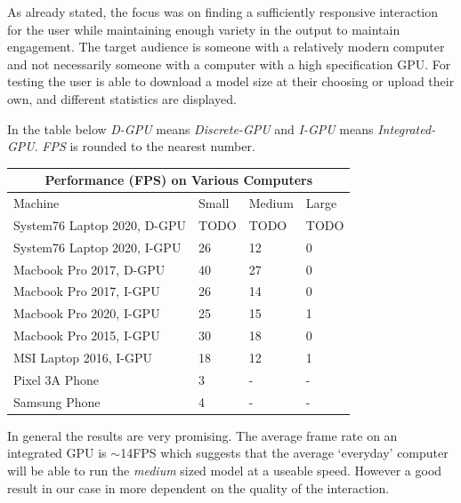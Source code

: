 \documentclass{article}
\begin{document}
As already stated, the focus was on finding a sufficiently responsive interaction for the user while maintaining enough variety in the output to maintain engagement. The target audience is someone with a relatively modern computer and not necessarily someone with a computer with a high specification GPU. For testing the user is able to download a model size at their choosing or upload their own, and different statistics are displayed.

In the table below \textit{D-GPU} means \textit{Discrete-GPU} and \textit{I-GPU} means \textit{Integrated-GPU}. \textit{FPS} is rounded to the nearest number.

\begin{small}
	\begin{center}
		\begin{tabular}{p{5cm} p{1.5cm} p{1.5cm} p{1.5cm}}
			\toprule
			\multicolumn{4}{c}{Performance (FPS) on Various Computers} \\
			\toprule
			Machine                     & Small & Medium & Large       \\
			\midrule
			System76 Laptop 2020, D-GPU & TODO  & TODO   & TODO        \\
			System76 Laptop 2020, I-GPU & 26    & 12     & 0           \\
			Macbook Pro 2017, D-GPU     & 40    & 27     & 0           \\
			Macbook Pro 2017, I-GPU     & 26    & 14     & 0           \\
			Macbook Pro 2020, I-GPU     & 25    & 15     & 1           \\
			Macbook Pro 2015, I-GPU     & 30    & 18     & 0           \\
			MSI Laptop 2016, I-GPU      & 18    & 12     & 1           \\
			Pixel 3A Phone              & 3     & -      & -           \\
			Samsung Phone               & 4     & -      & -           \\
			\bottomrule
		\end{tabular}
	\end{center}
\end{small}

In general the results are very promising. The average frame rate on an integrated GPU is $\sim$14FPS which suggests that the average `everyday' computer will be able to run the \textit{medium} sized model at a useable speed. However a good result in our case in more dependent on the quality of the interaction.
\end{document}
